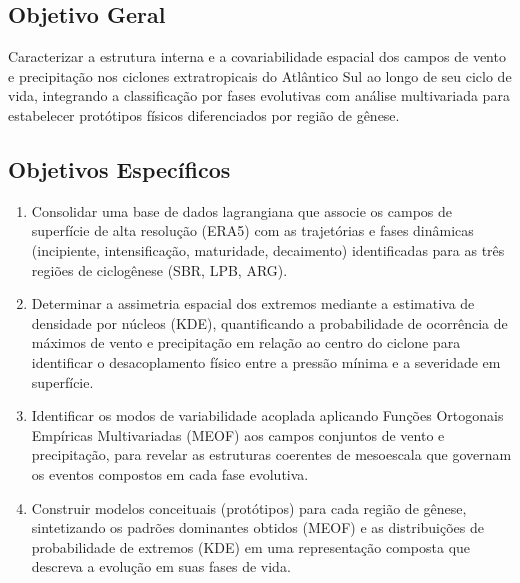 \subsection{Objetivo Geral}
Caracterizar a estrutura interna e a covariabilidade espacial dos campos de vento e precipitação nos ciclones extratropicais do Atlântico Sul ao longo de seu ciclo de vida, integrando a classificação por fases evolutivas com análise multivariada para estabelecer protótipos físicos diferenciados por região de gênese.

\subsection{Objetivos Específicos}
\begin{enumerate}
    \item Consolidar uma base de dados lagrangiana que associe os campos de superfície de alta resolução (ERA5) com as trajetórias e fases dinâmicas (incipiente, intensificação, maturidade, decaimento) identificadas para as três regiões de ciclogênese (SBR, LPB, ARG).
    \item Determinar a assimetria espacial dos extremos mediante a estimativa de densidade por núcleos (KDE), quantificando a probabilidade de ocorrência de máximos de vento e precipitação em relação ao centro do ciclone para identificar o desacoplamento físico entre a pressão mínima e a severidade em superfície.
    \item Identificar os modos de variabilidade acoplada aplicando Funções Ortogonais Empíricas Multivariadas (MEOF) aos campos conjuntos de vento e precipitação, para revelar as estruturas coerentes de mesoescala que governam os eventos compostos em cada fase evolutiva.
    \item Construir modelos conceituais (protótipos) para cada região de gênese, sintetizando os padrões dominantes obtidos (MEOF) e as distribuições de probabilidade de extremos (KDE) em uma representação composta que descreva a evolução em suas fases de vida.
\end{enumerate}